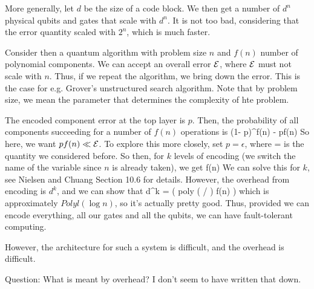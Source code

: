 More generally, let $d$ be the size of a code block. We then get a number of $d^n$ physical qubits and gates that scale with $d^n$. It is not too bad, considering that the error quantity scaled with $2^n$, which is much faster. 

Consider then a quantum algorithm with problem size $n$ and $f(n)$ number of polynomial components. We can accept an overall error $\mathcal{E}$, where $\mathcal{E}$ must not scale with $n$. Thus, if we repeat the algorithm, we bring down the error. This is the case for e.g. Grover's unstructured search algorithm. Note that by problem size, we mean the parameter that determines the complexity of hte problem. 

The encoded component error at the top layer is $p$. Then, the probability of all components succeeding for a number of $f(n)$ operations is
\beq
(1- p)^{f(n)}  - pf(n)
\eeq
So here, we want $pf(n) \ll \mathcal{E}$. To explore this more closely, set $p = \epsilon$, where
\beq
\epsilon = 
\eeq
is the quantity we considered before. So then, for $k$ levels of encoding (we switch the name of the variable since $n$ is already taken), we get
\beq
{} f(n) \ll \calE
\eeq
We can solve this for $k$, see Nielsen and Chuang Section 10.6 for details. However, the overhead from encoding is $d^k$, and we can show that
\beq
d^k =  \left( poly \left(  / \calE \right) f(n) \right)
\eeq
which is approximately $Polyl(\log{n})$, so it's actually pretty good. Thus, provided we can encode everything, all our gates and all the qubits, we can have fault-tolerant computing. 

However, the architecture for such a system is difficult, and the overhead is difficult. 

Question: What is meant by overhead? I don't seem to have written that down. 








